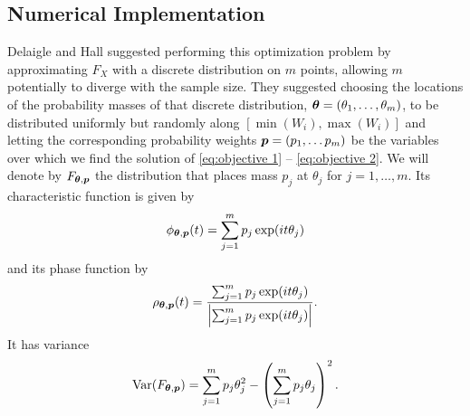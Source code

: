 	

	

	\subsection{Numerical Implementation}

	Delaigle and Hall \cite{Delaigle2016-la} suggested performing this optimization problem by approximating $F_X$ with a discrete distribution on $m$ points, allowing $m$ potentially to diverge with the sample size. They suggested choosing the locations of the probability masses of that discrete distribution, ${\bm{{\theta}}} = (\theta_1, \dots, \theta_m)$, to be distributed uniformly but randomly along $[\min(W_i), \max(W_i)]$ and letting the corresponding probability weights ${\bm{{p}}} = (p_1, \dots p_m)$ be the variables over which we find the solution of \eqref{eq:objective 1} -- \eqref{eq:objective 2}. We will denote by $F_{{\bm{{\theta}}}, {\bm{{p}}}}$ the distribution that places mass $p_j$ at $\theta_j$ for $j = 1,\dots, m$. Its characteristic function is given by
	\begin{equation}
		\phi_{{\bm{{\theta}}}, {\bm{{p}}}}(t) = \sum_{j = 1}^m p_j \exp(it\theta_j)
	\end{equation}
	and its phase function by
	\begin{equation}
		\rho_{{\bm{{\theta}}}, {\bm{{p}}}}(t) = \frac{ \sum_{j = 1}^m p_j \exp(it\theta_j)}{\left| \sum_{j = 1}^m p_j \exp(it\theta_j)\right|}.
	\end{equation}
	It has variance
	\begin{equation}
		\mathrm{Var}(F_{{\bm{{\theta}}}, {\bm{{p}}}}) = \sum_{j = 1}^m p_j \theta_j^2 - \left( \sum_{j=1}^m p_j \theta_j \right)^2.
	\end{equation}

